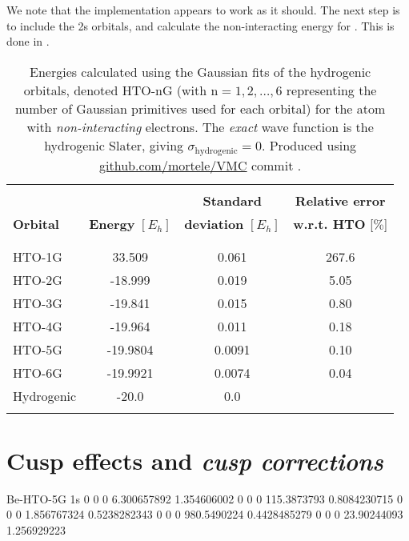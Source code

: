\documentclass[../../master.tex]{subfiles}
\begin{document}
We note that the implementation appears to work as it should. The next step is to include the 2s orbitals, and calculate the non-interacting energy for . This is done in .

\begin{table}
\centering{}
\setlength\extrarowheight{2pt}
\begin{tabularx}{\textwidth}{X *{3}{S[table-format=-1.3,table-space-text-post=***]}}
\hline
\hline
\\[-0.9em]
                 &                          & \phantom{-}\textbf{Standard}          & \textbf{Relative error}    \\
\textbf{Orbital} & \textbf{Energy} $[E_h]$  & \textbf{deviation} $[E_h]$ & \textbf{w.r.t. HTO} [$\%$]  \\
\\[-0.9em]
\hline
\\[-0.9em]
HTO-1G &  33.509   & 0.061   &  267.6 \\
HTO-2G & -18.999   & 0.019   &  5.05 \\
HTO-3G & -19.841   & 0.015   &  0.80 \\
HTO-4G & -19.964   & 0.011   &  0.18 \\
HTO-5G & -19.9804  & 0.0091  &  0.10 \\
HTO-6G & -19.9921  & 0.0074  &  0.04 \\
Hydrogenic    & -20.0    & 0.0 & \\
\\[-0.9em]
\hline
\end{tabularx}
\caption{Energies calculated using the Gaussian fits of the hydrogenic orbitals, denoted HTO-nG (with n$=1,2,\dots,6$ representing the number of Gaussian primitives used for each orbital) for the  atom with \emph{non-interacting} electrons. The \emph{exact} wave function is the hydrogenic Slater, giving $\sigma_\text{hydrogenic}=0$. Produced using \url{github.com/mortele/VMC} commit . \label{tab:vmcgaussnonint2}}
\end{table}

\section{Cusp effects and \emph{cusp corrections}}
Be-HTO-5G 1s
0 0 0     6.300657892     1.354606002
0 0 0     115.3873793    0.8084230715
0 0 0     1.856767324    0.5238282343
0 0 0     980.5490224    0.4428485279
0 0 0     23.90244093     1.256929223
\end{document}
